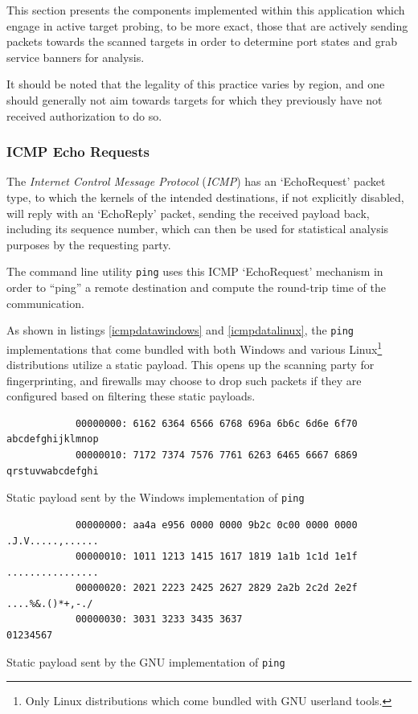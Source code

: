 \documentclass[a4paper,12pt]{article}
\begin{document}
	This section presents the components implemented within this application which engage in active target probing, to be more exact, those that are actively sending packets towards the scanned targets in order to determine port states and grab service banners for analysis.
	
	It should be noted that the legality of this practice varies by region, and one should generally not aim towards targets for which they previously have not received authorization to do so.

\subsubsection{ICMP Echo Requests} \label{icmpping}
 

	The \textit{Internet Control Message Protocol} (\textit{ICMP}) has an `EchoRequest' packet type, to which the kernels of the intended destinations, if not explicitly disabled, will reply with an `EchoReply' packet, sending the received payload back, including its sequence number, which can then be used for statistical analysis purposes by the requesting party.

	The command line utility \texttt{ping} uses this ICMP `EchoRequest' mechanism in order to ``ping'' a remote destination and compute the round-trip time of the communication.
	
	As shown in listings \ref{icmpdatawindows} and \ref{icmpdatalinux}, the \texttt{ping} implementations that come bundled with both Windows and various Linux\footnote{Only Linux distributions which come bundled with GNU userland tools.} distributions utilize a static payload. This opens up the scanning party for fingerprinting, and firewalls may choose to drop such packets if they are configured based on filtering these static payloads.
	
	\begin{listing}[H]
		\begin{verbatim}
			00000000: 6162 6364 6566 6768 696a 6b6c 6d6e 6f70  abcdefghijklmnop
			00000010: 7172 7374 7576 7761 6263 6465 6667 6869  qrstuvwabcdefghi
		\end{verbatim}
		\caption{Static payload sent by the Windows implementation of \texttt{ping}}
		\label{icmpdatawindows}
	\end{listing}
	
	\begin{listing}[H]
		\begin{verbatim}
			00000000: aa4a e956 0000 0000 9b2c 0c00 0000 0000  .J.V.....,......
			00000010: 1011 1213 1415 1617 1819 1a1b 1c1d 1e1f  ................
			00000020: 2021 2223 2425 2627 2829 2a2b 2c2d 2e2f   ....%&.()*+,-./
			00000030: 3031 3233 3435 3637                      01234567
		\end{verbatim}
		\caption{Static payload sent by the GNU implementation of \texttt{ping}}
		\label{icmpdatalinux}
	\end{listing}
	
\end{document}
